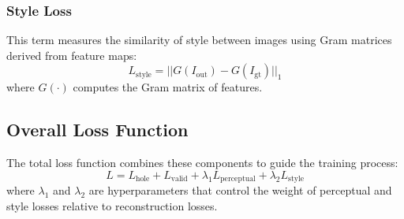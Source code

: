 \documentclass{article}
\begin{document}
\subsubsection*{Style Loss}
This term measures the similarity of style between images using Gram matrices derived from feature maps:
\[
L_{\text{style}} = ||G(I_{\text{out}}) - G(I_{\text{gt}})||_1
\]
where \( G(\cdot) \) computes the Gram matrix of features.

\subsection*{Overall Loss Function}
The total loss function combines these components to guide the training process:
\[
L = L_{\text{hole}} + L_{\text{valid}} + \lambda_1 L_{\text{perceptual}} + \lambda_2 L_{\text{style}}
\]
where \( \lambda_1 \) and \( \lambda_2 \) are hyperparameters that control the weight of perceptual and style losses relative to reconstruction losses.
\end{document}
